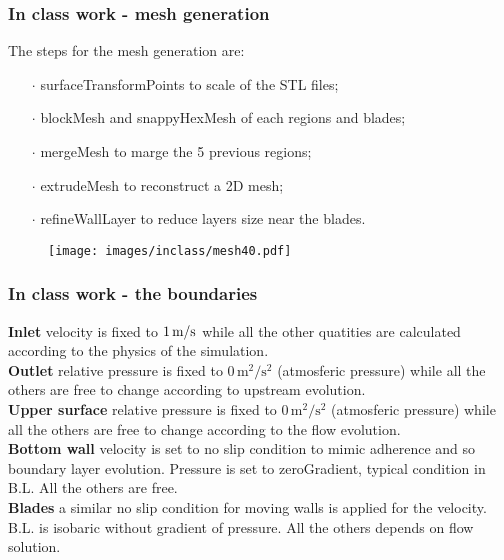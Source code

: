 \documentclass[aspectratio=169]{beamer}
\newcommand{\foam}[1]{{\ttfamily #1}}
\begin{document}
\begin{frame}
\frametitle{In class work - mesh generation}
The steps for the mesh generation are:
\begin{itemize}
\item[$\cdot$] \foam{surfaceTransformPoints} to scale of the STL files;
\item[$\cdot$] \foam{blockMesh} and \foam{snappyHexMesh} of each regions and blades;
\item[$\cdot$] \foam{mergeMesh} to marge the 5 previous regions;
\item[$\cdot$] \foam{extrudeMesh} to reconstruct a 2D mesh;
\item[$\cdot$] \foam{refineWallLayer} to reduce layers size near the blades.
\end{itemize}

\begin{figure}[H]
\centering
\texttt{[image: images/inclass/mesh40.pdf]}
\end{figure}

\end{frame}

\begin{frame}
\frametitle{In class work - the boundaries}

\textbf{Inlet} \quad velocity is fixed to $1\,\text{m}/\text{s}$ while all the other quatities are calculated according to the physics of the simulation.
\\
\textbf{Outlet} \quad relative pressure is fixed to $0 \,\text{m}^2/\text{s}^2$ (atmosferic pressure) while all the others are free to change according to upstream evolution.
\\
\textbf{Upper surface} \quad relative pressure is fixed to $0 \,\text{m}^2/\text{s}^2$ (atmosferic pressure) while all the others are free to change according to the flow evolution.
\\
\textbf{Bottom wall} \quad velocity is set to no slip condition to mimic adherence and so boundary layer evolution. Pressure is set to \foam{zeroGradient}, typical condition in B.L. All the others are free.
\\\textbf{Blades} \quad a similar no slip condition for moving walls is applied for the velocity. B.L. is isobaric without gradient of pressure. All the others depends on flow solution.

\end{frame}
\end{document}
